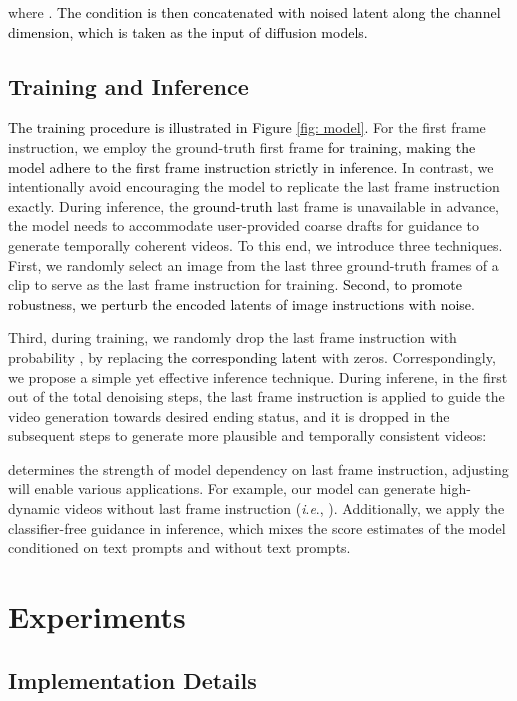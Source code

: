\documentclass[10pt,twocolumn,letterpaper]{article}
\newcommand{\tcb}{\textcolor{black}}
\newcommand{\tcr}{\textcolor{black}}
\newcommand{\tco}{\textcolor{black}}
\newcommand{\ieno}{\textit{i}.\textit{e}.}
\begin{document}
where . \tcr{The condition  is then concatenated with noised latent  along the channel dimension, which is taken as the input of diffusion models.}



\subsection{Training and Inference}
\label{sec: infer}

\tcb{The training procedure is illustrated in Figure \ref{fig: model}.}
For the first frame instruction, we employ the ground-truth first frame \tcb{for training, making the model adhere to the first frame instruction strictly in inference}. In contrast, we intentionally avoid encouraging the model to replicate the last frame instruction exactly. 
During inference, the \tco{ground-truth} last frame is unavailable in advance, the model needs to accommodate user-provided coarse drafts for guidance to generate temporally coherent videos. To this end, we introduce three techniques. First, we randomly select an image from the last three ground-truth frames of a clip to serve as the last frame instruction for training. 
\tcb{Second, to promote robustness, we perturb the encoded latents  of image instructions with noise}.


Third, during training, we randomly drop the last frame instruction with probability , by replacing \tcb{the corresponding latent}
with zeros. Correspondingly, we propose a simple yet effective inference technique. During inferene, in the first  out of the total  denoising steps, the last frame instruction is applied to guide the video generation towards desired ending status, and it is dropped in the subsequent steps to generate more plausible and temporally consistent videos:

 determines the strength of model dependency on last frame instruction, adjusting  will enable various applications. For example, our model can generate high-dynamic videos without last frame instruction (\ieno, ). 
Additionally, we apply the classifier-free guidance \cite{ho2022classifierfree} in inference, which mixes the score estimates of the model conditioned on text prompts and without text prompts.

 \section{Experiments}


\subsection{Implementation Details}
\label{sec: details}
\end{document}
